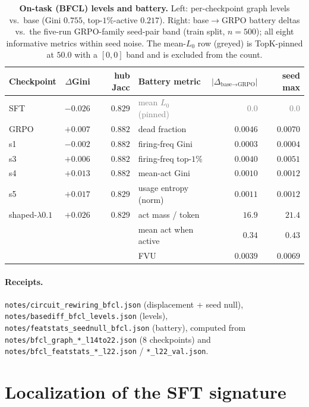 \documentclass{article}
\begin{document}
\begin{table}[h]
\centering
\caption{\textbf{On-task (BFCL) levels and battery.} Left: per-checkpoint graph levels vs.\ base (Gini $0.755$, top-$1\%$-active $0.217$). Right: base$\to$GRPO battery deltas vs.\ the five-run GRPO-family seed-pair band (train split, $n{=}500$); all eight informative metrics within seed noise. The mean-$L_0$ row (greyed) is TopK-pinned at $50.0$ with a $[0,0]$ band and is excluded from the count.}
\label{tab:ontask_battery}
\small
\begin{tabular}{lrr|lrr}
\toprule
Checkpoint & $\Delta$Gini & hub Jacc & Battery metric & $|\Delta_{\text{base}\to\text{GRPO}}|$ & seed max \\
\midrule
SFT     & $-0.026$ & $0.829$ & \textcolor{gray}{mean $L_0$ (pinned)} & \textcolor{gray}{$0.0$} & \textcolor{gray}{$0.0$} \\
GRPO    & $+0.007$ & $0.882$ & dead fraction & $0.0046$ & $0.0070$ \\
s1      & $-0.002$ & $0.882$ & firing-freq Gini & $0.0003$ & $0.0004$ \\
s3      & $+0.006$ & $0.882$ & firing-freq top-$1\%$ & $0.0040$ & $0.0051$ \\
s4      & $+0.013$ & $0.882$ & mean-act Gini & $0.0010$ & $0.0012$ \\
s5      & $+0.017$ & $0.829$ & usage entropy (norm) & $0.0011$ & $0.0012$ \\
shaped-$\lambda0.1$ & $+0.026$ & $0.829$ & act mass / token & $16.9$ & $21.4$ \\
        &          &         & mean act when active & $0.34$ & $0.43$ \\
        &          &         & FVU & $0.0039$ & $0.0069$ \\
\bottomrule
\end{tabular}
\end{table}

\paragraph{Receipts.} \texttt{notes/circuit\_rewiring\_bfcl.json} (displacement + seed null), \texttt{notes/basediff\_bfcl\_levels.json} (levels), \texttt{notes/featstats\_seednull\_bfcl.json} (battery), computed from \texttt{notes/bfcl\_graph\_*\_l14to22.json} ($8$ checkpoints) and \texttt{notes/bfcl\_featstats\_*\_l22.json} / \texttt{*\_l22\_val.json}.

\section{Localization of the SFT signature}
\label{app:localization}
\end{document}
